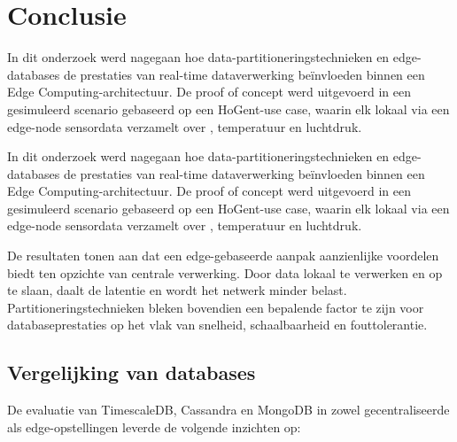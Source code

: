 
\chapter{Conclusie}%
\label{ch:conclusie}


In dit onderzoek werd nagegaan hoe data-partitioneringstechnieken en edge-databases de prestaties van real-time dataverwerking beïnvloeden binnen een Edge Computing-architectuur. De proof of concept werd uitgevoerd in een gesimuleerd scenario gebaseerd op een HoGent-use case, waarin elk lokaal via een edge-node sensordata verzamelt over , temperatuur en luchtdruk.

In dit onderzoek werd nagegaan hoe data-partitioneringstechnieken en edge-databases de prestaties van real-time dataverwerking beïnvloeden binnen een Edge Computing-architectuur. De proof of concept werd uitgevoerd in een gesimuleerd scenario gebaseerd op een HoGent-use case, waarin elk lokaal via een edge-node sensordata verzamelt over , temperatuur en luchtdruk.

De resultaten tonen aan dat een edge-gebaseerde aanpak aanzienlijke voordelen biedt ten opzichte van centrale verwerking. Door data lokaal te verwerken en op te slaan, daalt de latentie en wordt het netwerk minder belast. Partitioneringstechnieken bleken bovendien een bepalende factor te zijn voor databaseprestaties op het vlak van snelheid, schaalbaarheid en fouttolerantie.

\section{Vergelijking van databases}

De evaluatie van TimescaleDB, Cassandra en MongoDB in zowel gecentraliseerde als edge-opstellingen leverde de volgende inzichten op:

